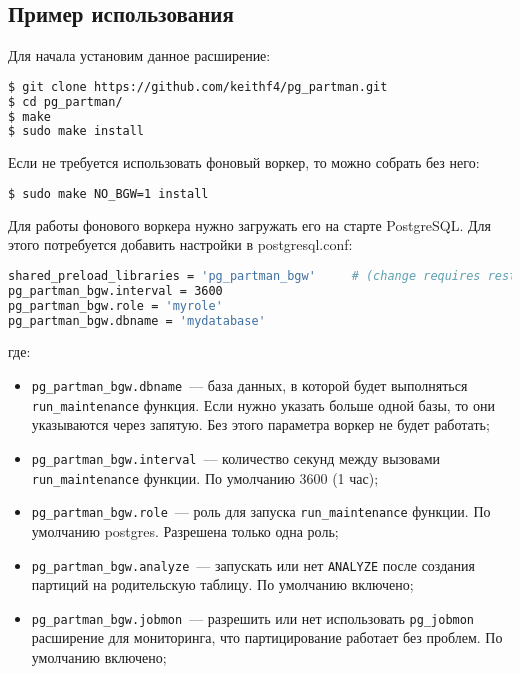 \subsection{Пример использования}

Для начала установим данное расширение:

\begin{lstlisting}[language=Bash,label=lst:pgpartman1,caption=Установка]
$ git clone https://github.com/keithf4/pg_partman.git
$ cd pg_partman/
$ make
$ sudo make install
\end{lstlisting}

Если не требуется использовать фоновый воркер, то можно собрать без него:

\begin{lstlisting}[language=Bash,label=lst:pgpartman2,caption=Установка]
$ sudo make NO_BGW=1 install
\end{lstlisting}

Для работы фонового воркера нужно загружать его на старте PostgreSQL. Для этого потребуется добавить настройки в postgresql.conf:

\begin{lstlisting}[language=Bash,label=lst:pgpartman3,caption=Настройки воркера]
shared_preload_libraries = 'pg_partman_bgw'     # (change requires restart)
pg_partman_bgw.interval = 3600
pg_partman_bgw.role = 'myrole'
pg_partman_bgw.dbname = 'mydatabase'
\end{lstlisting}

где:

\begin{itemize}
  \item \lstinline!pg_partman_bgw.dbname!~--- база данных, в которой будет выполняться \lstinline!run_maintenance! функция. Если нужно указать больше одной базы, то они указываются через запятую. Без этого параметра воркер не будет работать;
  \item \lstinline!pg_partman_bgw.interval!~--- количество секунд между вызовами \lstinline!run_maintenance! функции. По умолчанию 3600 (1 час);
  \item \lstinline!pg_partman_bgw.role!~--- роль для запуска \lstinline!run_maintenance! функции. По умолчанию postgres. Разрешена только одна роль;
  \item \lstinline!pg_partman_bgw.analyze!~--- запускать или нет \lstinline!ANALYZE! после создания партиций на родительскую таблицу. По умолчанию включено;
  \item \lstinline!pg_partman_bgw.jobmon!~--- разрешить или нет использовать \lstinline!pg_jobmon! расширение для мониторинга, что партицирование работает без проблем. По умолчанию включено;
\end{itemize}

